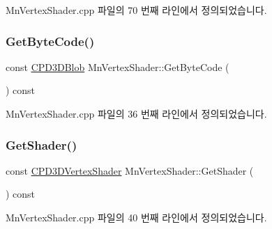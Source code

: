 Mn\+Vertex\+Shader.\+cpp 파일의 70 번째 라인에서 정의되었습니다.

\mbox{\label{class_m_n_l_1_1_mn_vertex_shader_a8fafc09c812a8209bc4726fb4fc56de8}} 
\subsubsection{\texorpdfstring{Get\+Byte\+Code()}{GetByteCode()}}
{\footnotesize\ttfamily const \hyperlink{namespace_m_n_l_a3716e3bee60c31fe1b7b5dd5a82db59a}{C\+P\+D3\+D\+Blob} Mn\+Vertex\+Shader\+::\+Get\+Byte\+Code (\begin{DoxyParamCaption}{ }\end{DoxyParamCaption}) const}



Mn\+Vertex\+Shader.\+cpp 파일의 36 번째 라인에서 정의되었습니다.

\mbox{\label{class_m_n_l_1_1_mn_vertex_shader_a2c2d71e7d34b9d996ff21896bf266e90}} 
\subsubsection{\texorpdfstring{Get\+Shader()}{GetShader()}}
{\footnotesize\ttfamily const \hyperlink{namespace_m_n_l_a8036d713226061c4827b537821fbf79b}{C\+P\+D3\+D\+Vertex\+Shader} Mn\+Vertex\+Shader\+::\+Get\+Shader (\begin{DoxyParamCaption}{ }\end{DoxyParamCaption}) const}



Mn\+Vertex\+Shader.\+cpp 파일의 40 번째 라인에서 정의되었습니다.

\mbox{\label{class_m_n_l_1_1_mn_vertex_shader_a571c6c25624a5a80eed0b918e15fedea}} 
